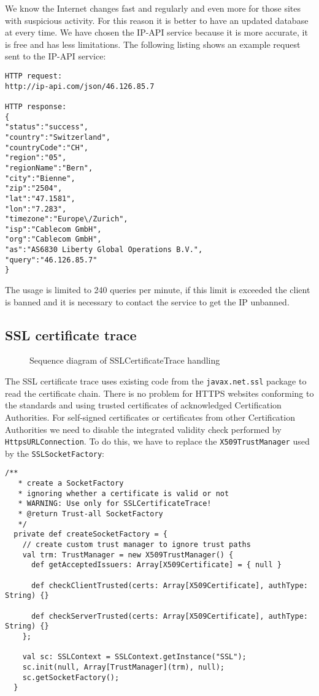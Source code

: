 \documentclass[
	a4paper,					10pt,							twoside,					openright,				notitlepage,			parskip=half,			]{scrreprt}
\begin{document}
We know the Internet changes fast and regularly and even more for those sites with suspicious activity. 
For this reason it is better to have an updated database at every time.
We have chosen the IP-API service because it is more accurate, it is free and has less limitations.
The following listing shows an example request sent to the IP-API service:

\begin{lstlisting}[language={}]
HTTP request:
http://ip-api.com/json/46.126.85.7

HTTP response:
{
"status":"success",
"country":"Switzerland",
"countryCode":"CH",
"region":"05",
"regionName":"Bern",
"city":"Bienne",
"zip":"2504",
"lat":"47.1581",
"lon":"7.283",
"timezone":"Europe\/Zurich",
"isp":"Cablecom GmbH",
"org":"Cablecom GmbH",
"as":"AS6830 Liberty Global Operations B.V.",
"query":"46.126.85.7"
}
\end{lstlisting}

The usage is limited to 240 queries per minute, if this limit is exceeded the client is banned and
it is necessary to contact the service to get the \gls{IP} unbanned.

\subsection{\gls{SSL} certificate trace}
\label{subsec:api_libstruct_ssl}

\begin{figure}[H] 
\caption{Sequence diagram of SSLCertificateTrace handling}
\label{fig:seq-sslcertificatetrace}
\end{figure}

The \gls{SSL} certificate trace uses existing code from the \verb|javax.net.ssl| package
to read the certificate chain. There is no problem for HTTPS websites conforming to 
the standards and using trusted certificates of acknowledged Certification Authorities.
For self-signed certificates or certificates from other Certification Authorities we need to disable
the integrated validity check performed by \verb|HttpsURLConnection|.
\newpage
To do this, we have to replace the \verb|X509TrustManager| used by the \verb|SSLSocketFactory|:

\begin{lstlisting}
/**
   * create a SocketFactory
   * ignoring whether a certificate is valid or not
   * WARNING: Use only for SSLCertificateTrace!
   * @return Trust-all SocketFactory
   */
  private def createSocketFactory = {
    // create custom trust manager to ignore trust paths
    val trm: TrustManager = new X509TrustManager() {
      def getAcceptedIssuers: Array[X509Certificate] = { null }

      def checkClientTrusted(certs: Array[X509Certificate], authType: String) {}

      def checkServerTrusted(certs: Array[X509Certificate], authType: String) {}
    };

    val sc: SSLContext = SSLContext.getInstance("SSL");
    sc.init(null, Array[TrustManager](trm), null);
    sc.getSocketFactory();
  }

\end{lstlisting}
\end{document}
